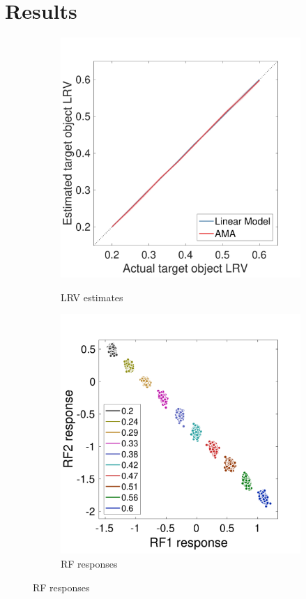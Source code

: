 \documentclass{jov}
\begin{document}
\section{Results} \label{Results}
\begin{figure}
\centering
            \begin{subfigure}[b]{0.25 \textwidth}
        \caption{LRV estimates}
        \includegraphics[width=\textwidth, trim={0 0 0 1.3cm},clip]{../FiguresDraft4/Figure10/Figure10_a.pdf}
        \label{fig:case1Estimates}
    \end{subfigure} 
        \begin{subfigure}[b]{0.26 \textwidth}
        \caption{RF responses}
        \includegraphics[width=\textwidth, trim={0 3mm 0 15mm},clip]{../FiguresDraft4/Figure10/Figure10_b.pdf}

\end{subfigure}
\end{figure}
\end{document}
